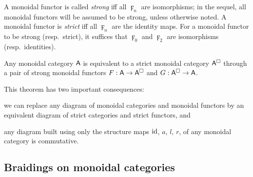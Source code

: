 A monoidal functor is called \emph{strong} iff all $\digamma_n$ are
isomorphisms; in the sequel, all monoidal functors will be assumed to
be strong, unless otherwise noted. A monoidal functor is \emph{strict}
iff all $\digamma_n$ are the identity maps. For a monoidal functor to be
strong (resp.\ strict), it suffices that $\digamma_0$ and $\digamma_2$ are
isomorphisms (resp.\ identities).

\begin{theorem*}
  Any monoidal category $\mathsf{A}$ is equivalent to a strict monoidal
  category $\mathsf{A}^\Box$ through a pair of strong monoidal functors $F: \mathsf{A}
  \to \mathsf{A}^\Box$ and $G: \mathsf{A}^\Box \to \mathsf{A}$.  
\end{theorem*}
This theorem has two important consequences:
\begin{inparaenum}
  we can replace any diagram of monoidal categories and monoidal
  functors by an equivalent diagram of strict categories and strict
  functors, and 
\item any diagram built using only the structure maps $\operatorname{id}$, $a$, $l$,
  $r$, of any monoidal category is commutative.
\end{inparaenum}


\subsection{Braidings on monoidal categories}
\label{sec:braidings}

